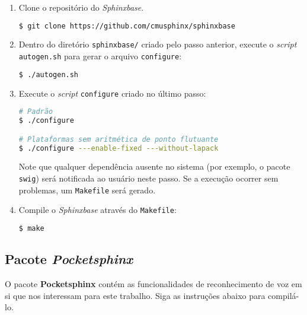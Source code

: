 \begin{enumerate}
\item Clone o repositório do \textit{Sphinxbase}.

\begin{lstlisting}[language=Bash]
$ git clone https://github.com/cmusphinx/sphinxbase
\end{lstlisting}

\item Dentro do diretório \texttt{sphinxbase/} criado pelo passo anterior, execute o \textit{script} \texttt{autogen.sh} para gerar o arquivo \texttt{configure}:

\begin{lstlisting}[language=Bash]
$ ./autogen.sh
\end{lstlisting}

\item Execute o \textit{script} \texttt{configure} criado no último passo:

\begin{lstlisting}[language=Bash]
# Padrão
$ ./configure

# Plataformas sem aritmética de ponto flutuante
$ ./configure ---enable-fixed ---without-lapack
\end{lstlisting}

Note que qualquer dependência ausente no sistema (por exemplo, o pacote \texttt{swig}) será notificada ao usuário neste passo. Se a execução ocorrer sem problemas, um \texttt{Makefile} será gerado.

\item Compile o \textit{Sphinxbase} através do \texttt{Makefile}:

\begin{lstlisting}[language=Bash]
$ make
\end{lstlisting}

\end{enumerate}


\subsection{Pacote \textit{Pocketsphinx}}
\label{pocketsphinxCompile}

O pacote \textbf{Pocketsphinx} contém as funcionalidades de reconhecimento de voz em si que nos interessam para este trabalho. Siga as instruções abaixo para compilá-lo.

